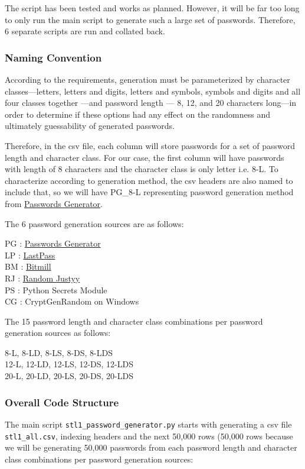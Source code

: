 \documentclass[letterpaper,twocolumn,10pt]{article}
\begin{document}
The script has been tested and works as planned. However, it will be far too long to only run the main script to generate such a large set of passwords. Therefore, 6 separate scripts are run and collated back.

\subsubsection{Naming Convention}
According to the requirements, generation must be parameterized by character classes—letters, letters and digits, letters and symbols, symbols and digits and all four classes together —and password length — 8, 12, and 20 characters long—in order to determine if these options had any effect on the randomness and ultimately guessability of generated passwords. 

Therefore, in the csv file, each column will store passwords for a set of password length and character class. For our case, the first column will have passwords with length of 8 characters and the character class is only letter i.e. 8-L. To characterize according to generation method, the csv headers are also named to include that, so we will have PG\_8-L representing password generation method from \href{https://passwordsgenerator.net/}{Passwords Generator}.

The 6 password generation sources are as follows:

PG : \href{https://passwordsgenerator.net/}{Passwords Generator}\\
LP : \href{https://www.lastpass.com/features/password-generator}{LastPass}\\
BM : \href{http://www.thebitmill.com/tools/password.html}{Bitmill}\\
RJ : \href{https://helloacm.com/random/}{Random Justyy}\\
PS : Python Secrets Module\\
CG : CryptGenRandom on Windows

The 15 password length and character class combinations per password generation sources as follows:

8-L, 8-LD, 8-LS, 8-DS, 8-LDS\\
12-L, 12-LD, 12-LS, 12-DS, 12-LDS\\
20-L, 20-LD, 20-LS, 20-DS, 20-LDS\\

\subsubsection{Overall Code Structure}
The main script \lstinline{stl1_password_generator.py} starts with generating a csv file \lstinline{stl1_all.csv}, indexing headers and the next 50,000 rows (50,000 rows because we will be generating 50,000 passwords from each password length and character class combinations per password generation sources:
\end{document}
